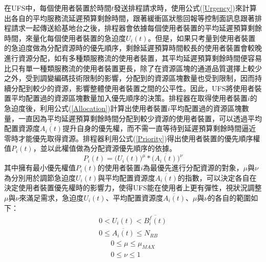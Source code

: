 在UFS中，每個使用者裝置於時間$t$發送排程請求時，使用公式(\ref{Urgency})來計算出各自的平均服務流延遲預算剩餘時間，跟著緩衝區狀態回報等控制面訊息跟著排程請求一起傳送給基地台之後，排程器會依據每個使用者裝置的平均延遲預算剩餘時間，來量化每個使用者裝置的急迫度$U_i(t)$。但是，如果只考量到使用者裝置的急迫度做為分配資源時的優先順序，剩餘延遲預算時間較長的使用者裝置會較晚進行資源分配，如有多種類服務流的使用者裝置，其平均延遲預算剩餘時間便容易比只有單一種類服務流的使用者裝置更長，除了在資源區塊的通道品質選擇上較少之外，受到調變編碼技術限制的影響，分配到的資源區塊數量也受到限制，因而持續分配到較少的資源，影響整體使用者裝置之間的公平性。因此，UFS將使用者裝置平均配置過的資源區塊數量加入優先順序的決策。排程器在取得使用者裝置$i$的急迫度後，利用公式(\ref{Allocation})計算出使用者裝置$i$平均配置過的資源區塊數量，一直因為平均延遲預算剩餘時間分配到較少資源的使用者裝置，可以透過平均配置資源度$\overline{A_i(t)}$提升自身的優先權，而不需一直等待到延遲預算剩餘時間逼近零時才能優先取得資源。排程器利用公式(\ref{Priority})得出使用者裝置的優先順序權值$P_i(t)$，並以此權值做為分配資源優先順序的依據。
\begin{equation}
\label{Priority}
P_i(t)=\big(U_i(t)\big)^\mu*\big(\overline{A_i(t)}\big)^\nu
\end{equation}
其中擁有最小優先權值$P_i(t)$的使用者裝置$i$為最優先進行分配資源的對象，$\mu$與$\nu$為分別用於調節急迫度$U_i(t)$與平均配置資源度$\overline{A_i(t)}$的指數，可以決定各自在決定使用者裝置優先權時的影響力，使得UFS能在使用者上更有彈性，視狀況調整$\mu$與$\nu$來滿足需求，急迫度$U_i(t)$、平均配置資源度$\overline{A_i(t)}$、$\mu$與$\nu$的各自的範圍如下：
\begin{equation}
\label{UFS_factor_range}
\left . 
\begin{array}{l} 

0 < U_i(t) < \overline{B_i^f(t)}
 \\ 
0 \leq \overline{A_i(t)} \leq N_{RB}

\end{array}\right .
\end{equation}
\begin{equation}
\label{UFS_exponent}
\left . 
\begin{array}{l} 
0\leq\mu\leq \mu_{MAX}
 \\ 
0\leq\nu\leq 1
\end{array}\right .
\end{equation}
